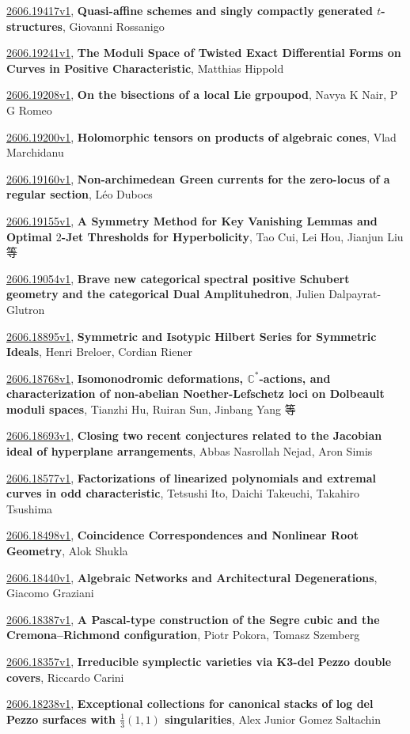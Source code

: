 \documentclass[9pt, a4paper]{article}
\theoremstyle{plain}
\theoremstyle{definition}
\theoremstyle{remark}
\newcommand{\arxiv}[3]{\href{https://arxiv.org/abs/#1}{#1}, \textbf{\textcolor{arxivblue}{#2}}, #3}
\begin{document}
\arxiv{2606.19417v1}{Quasi-affine schemes and singly compactly generated $t$-structures}{Giovanni Rossanigo}

\arxiv{2606.19241v1}{The Moduli Space of Twisted Exact Differential Forms on Curves in Positive Characteristic}{Matthias Hippold}

\arxiv{2606.19208v1}{On the bisections of a local Lie grpoupod}{Navya K Nair, P G Romeo}

\arxiv{2606.19200v1}{Holomorphic tensors on products of algebraic cones}{Vlad Marchidanu}

\arxiv{2606.19160v1}{Non-archimedean Green currents for the zero-locus of a regular section}{Léo Dubocs}

\arxiv{2606.19155v1}{A Symmetry Method for Key Vanishing Lemmas and Optimal $2$-Jet Thresholds for Hyperbolicity}{Tao Cui, Lei Hou, Jianjun Liu 等}

\arxiv{2606.19054v1}{Brave new categorical spectral positive Schubert geometry and the categorical Dual Amplituhedron}{Julien Dalpayrat-Glutron}

\arxiv{2606.18895v1}{Symmetric and Isotypic Hilbert Series for Symmetric Ideals}{Henri Breloer, Cordian Riener}

\arxiv{2606.18768v1}{Isomonodromic deformations, $\mathbb C^*$-actions, and characterization of non-abelian Noether-Lefschetz loci on Dolbeault moduli spaces}{Tianzhi Hu, Ruiran Sun, Jinbang Yang 等}

\arxiv{2606.18693v1}{Closing two recent conjectures related to the Jacobian ideal of hyperplane arrangements}{Abbas Nasrollah Nejad, Aron Simis}

\arxiv{2606.18577v1}{Factorizations of linearized polynomials and extremal curves in odd characteristic}{Tetsushi Ito, Daichi Takeuchi, Takahiro Tsushima}

\arxiv{2606.18498v1}{Coincidence Correspondences and Nonlinear Root Geometry}{Alok Shukla}

\arxiv{2606.18440v1}{Algebraic Networks and Architectural Degenerations}{Giacomo Graziani}

\arxiv{2606.18387v1}{A Pascal-type construction of the Segre cubic and the Cremona--Richmond configuration}{Piotr Pokora, Tomasz Szemberg}

\arxiv{2606.18357v1}{Irreducible symplectic varieties via K3-del Pezzo double covers}{Riccardo Carini}

\arxiv{2606.18238v1}{Exceptional collections for canonical stacks of log del Pezzo surfaces with $\frac13(1,1)$ singularities}{Alex Junior Gomez Saltachin}
\end{document}
